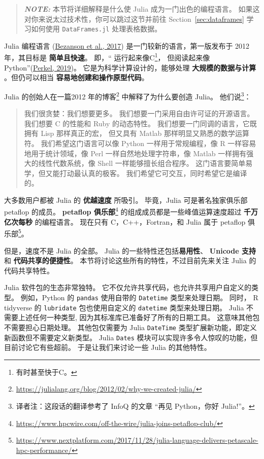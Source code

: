 \documentclass[
  notoc %
]{tufte-book}
\DeclareRobustCommand{\href}[2]{#2\footnote{\url{#1}}}
\newcommand{\passthrough}[1]{#1}
\begin{document}
\begin{quote}
\textbf{\emph{NOTE:}} 本节将详细解释是什么使 Julia
成为一门出色的编程语言。 如果这对你来说太过技术性，你可以跳过这节并前往
Section~\ref{sec:dataframes} 学习如何使用
\passthrough{\lstinline!DataFrames.jl!} 处理表格数据。
\end{quote}

Julia 编程语言 (\protect\hyperlink{ref-bezanson2017julia}{Bezanson et
al., 2017}) 是一门较新的语言，第一版发布于 2012 年，其目标是
\textbf{简单且快速}。 即，`` 运行起来像C\footnote{有时甚至快于C。}，
但阅读起来像
Python''(\protect\hyperlink{ref-perkelJuliaComeSyntax2019}{Perkel,
2019})。 它是为科学计算设计的，能够处理 \textbf{大规模的数据与计算}
。但仍可以相当 \textbf{容易地创建和操作原型代码}。

Julia
的创始人在一篇\href{https://julialang.org/blog/2012/02/why-we-created-julia/}{2012
年的博客} 中解释了为什么要创造 Julia。 他们说\footnote{译者注：这段话的翻译参考了
  InfoQ 的文章 ``再见 Python，你好 Julia!''。}：

\begin{quote}
我们很贪婪：我们想要更多。 我们想要一门采用自由许可证的开源语言。
我们想要 C 的性能和 Ruby 的动态特性。 我们想要一门同调的语言，它既拥有
Lisp 那样真正的宏， 但又具有 Matlab 那样明显又熟悉的数学运算符。
我们希望这门语言可以像 Python 一样用于常规编程，像 R
一样容易地用于统计领域，像 Perl 一样自然地处理字符串，像 Matlab
一样拥有强大的线性代数系统，像 Shell 一样能够擅长组合程序。
这门语言要简单易学，但又能打动最认真的极客。
我们希望它可交互，同时希望它是编译的。
\end{quote}

大多数用户都被 Julia 的 \textbf{优越速度} 所吸引。 毕竟，Julia
可是著名独家俱乐部 petaflop 的成员。
\href{https://www.hpcwire.com/off-the-wire/julia-joins-petaflop-club/}{\textbf{petaflop
俱乐部}} 的组成成员都是一些峰值运算速度超过 \textbf{千万亿次每秒}
的编程语言。 现在只有 C，C++，Fortran，和 Julia 属于
\href{https://www.nextplatform.com/2017/11/28/julia-language-delivers-petascale-hpc-performance/}{petaflop
俱乐部}。

但是，速度不是 Julia 的全部。 Julia 的一些特性还包括\textbf{易用性}、
\textbf{Unicode 支持} 和 \textbf{代码共享的便捷性}。
本节将讨论这些所有的特性，不过目前先来关注 Julia 的代码共享特性。

Julia 软件包的生态非常独特。
它不仅允许共享代码，也允许共享用户自定义的类型。 例如，Python 的
\passthrough{\lstinline!pandas!} 使用自带的
\passthrough{\lstinline!Datetime!} 类型来处理日期。 同时， R tidyverse
的 \passthrough{\lstinline!lubridate!} 包也使用自定义的
\passthrough{\lstinline!datetime!} 类型来处理日期。 Julia
不需要上述任何一种类型, 因为其标准库已准备好了所有的日期工具。
这意味其他包不需要担心日期处理。 其他包仅需要为 Julia
\passthrough{\lstinline!DateTime!}
类型扩展新功能，即定义新函数但不需要定义新类型。 Julia
\passthrough{\lstinline!Dates!}
模块可以实现许多令人惊叹的功能，但目前讨论它有些超前。
于是让我们来讨论一些 Julia 的其他特性。
\end{document}

